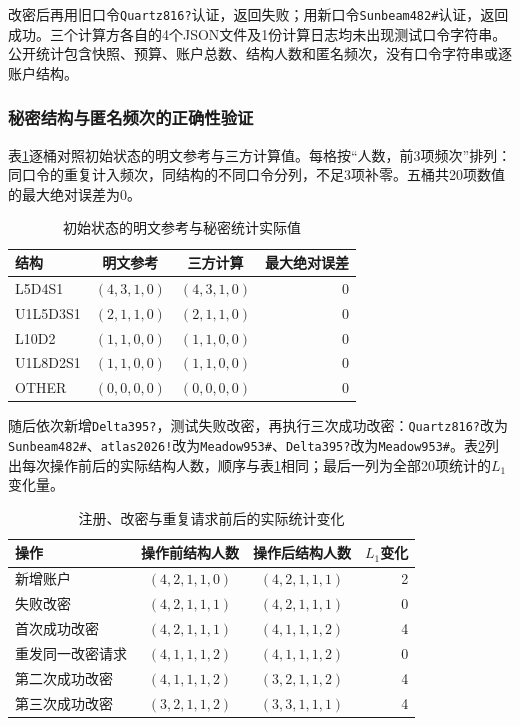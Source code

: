 \documentclass{crypto_report}
\begin{document}
改密后再用旧口令\texttt{Quartz816?}认证，返回失败；用新口令\texttt{Sunbeam482\#}认证，返回成功。三个计算方各自的4个JSON文件及1份计算日志均未出现测试口令字符串。公开统计包含快照、预算、账户总数、结构人数和匿名频次，没有口令字符串或逐账户结构。

\subsubsection{秘密结构与匿名频次的正确性验证}\label{sec:validation-privacy-3}

表\ref{tab:privacy-secret-statistics}逐桶对照初始状态的明文参考与三方计算值。每格按“人数，前3项频次”排列：同口令的重复计入频次，同结构的不同口令分列，不足3项补零。五桶共20项数值的最大绝对误差为0。

\begin{table}[H]
\centering
\caption{初始状态的明文参考与秘密统计实际值}\label{tab:privacy-secret-statistics}
\small
\begin{tabular}{@{}lccr@{}}
\toprule
结构 & 明文参考 & 三方计算 & 最大绝对误差 \\
\midrule
L5D4S1 & $(4,3,1,0)$ & $(4,3,1,0)$ & 0 \\
U1L5D3S1 & $(2,1,1,0)$ & $(2,1,1,0)$ & 0 \\
L10D2 & $(1,1,0,0)$ & $(1,1,0,0)$ & 0 \\
U1L8D2S1 & $(1,1,0,0)$ & $(1,1,0,0)$ & 0 \\
OTHER & $(0,0,0,0)$ & $(0,0,0,0)$ & 0 \\
\bottomrule
\end{tabular}
\end{table}

随后依次新增\texttt{Delta395?}，测试失败改密，再执行三次成功改密：\texttt{Quartz816?}改为\texttt{Sunbeam482\#}、\texttt{atlas2026!}改为\texttt{Meadow953\#}、\texttt{Delta395?}改为\texttt{Meadow953\#}。表\ref{tab:privacy-statistic-updates}列出每次操作前后的实际结构人数，顺序与表\ref{tab:privacy-secret-statistics}相同；最后一列为全部20项统计的$L_1$变化量。

\begin{table}[H]
\centering
\caption{注册、改密与重复请求前后的实际统计变化}\label{tab:privacy-statistic-updates}
\small
\begin{tabular}{@{}lccr@{}}
\toprule
操作 & 操作前结构人数 & 操作后结构人数 & $L_1$变化 \\
\midrule
新增账户 & $(4,2,1,1,0)$ & $(4,2,1,1,1)$ & 2 \\
失败改密 & $(4,2,1,1,1)$ & $(4,2,1,1,1)$ & 0 \\
首次成功改密 & $(4,2,1,1,1)$ & $(4,1,1,1,2)$ & 4 \\
重发同一改密请求 & $(4,1,1,1,2)$ & $(4,1,1,1,2)$ & 0 \\
第二次成功改密 & $(4,1,1,1,2)$ & $(3,2,1,1,2)$ & 4 \\
第三次成功改密 & $(3,2,1,1,2)$ & $(3,3,1,1,1)$ & 4 \\
\bottomrule
\end{tabular}
\end{table}
\end{document}
